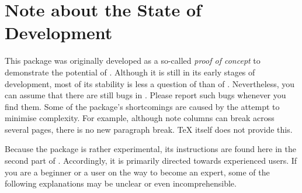 \section{Note about the State of Development}

This package was originally developed as a so-called \emph{proof of
  concept} to demonstrate the potential of
\hyperref[cha:scrlayer]{}%
. Although it is still
in its early stages of development, most of its stability is less a question
of  than of
\hyperref[cha:scrlayer]{}. Nevertheless, you can assume that
there are still bugs in . Please report such bugs
whenever you find them. Some of the package's shortcomings are caused by the
attempt to minimise complexity. For example, although note columns can break
across several pages, there is no new paragraph break. \TeX{} itself does not
provide this.

Because the package is rather experimental, its
instructions are found here in the second part of . Accordingly, it is primarily directed towards experienced
users. If you are a beginner or a user on the way to become an
expert, some of the following explanations may be
unclear or even incomprehensible.

\iffalse%
Note also\textnote{Attention!} that the author of \KOMAScript{} does not
guarantee the further development of this package and offers only limited
support for it. This is the nature of a package written solely for the
purposes of demonstration.%
\fi



